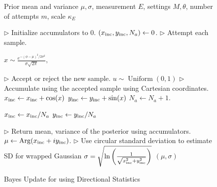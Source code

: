 \documentclass[aps,pra,amsmath,twocolumn,amssymb,superscriptaddress]{revtex4-1}
\newcommand{\linecomment}[1]{\State \(\triangleright\) {\footnotesize #1} \normalsize}
\newcommand{\CRej}{\text{RejF }}
\begin{document}
\begin{figure}[h]
\begin{algorithm}[H]
    \caption{Bayes Update for \CRej using Directional Statistics}
    \label{alg:crej2}
    \begin{algorithmic}

        \Require Prior mean and variance $\mu,\sigma$, measurement $E$,
            settings $M,\theta$, number of attempts $m$, scale $\kappa_E$

        \linecomment{Initialize accumulators to 0.}
	\State $(x_{\rm inc},y_{\rm inc},N_a) \gets 0$.
        \linecomment{Attempt each sample.}

            \State $x \sim\frac{e^{-(\phi-\mu)^2/2 \sigma^2}}{\sigma\sqrt{2 \pi }},$
          
            \linecomment{Accept or reject the new sample.}
            \State $u \sim \operatorname{Uniform}(0, 1)$
                \linecomment{Accumulate using the accepted sample using Cartesian coordinates.}
                \State $x_{\rm inc} \gets x_{\rm inc}+ \cos(x)$
                \State $y_{\rm inc} \gets y_{\rm inc}+ \sin(x)$
                \State $N_a \gets N_a +1$.
            \EndIf
        \EndFor

        \State $x_{\rm inc}\gets x_{\rm inc}/N_a $
        \State $y_{\rm inc}\gets y_{\rm inc}/N_a $

        \linecomment{Return mean, variance of the posterior using accumulators.}
	\State $\mu\gets {\rm Arg}(x_{\rm inc}+iy_{\rm inc})$.
\linecomment{Use circular standard deviation to estimate SD for wrapped Gaussian}
	\State $\sigma = \sqrt{\ln\left(\frac{1}{\sqrt{x_{\rm inc}^2 + y_{\rm inc}^2}}\right)}$
        \State\Return $(\mu,\sigma)$

    \end{algorithmic}
\end{algorithm}
\end{figure}
\newpage
\end{document}
